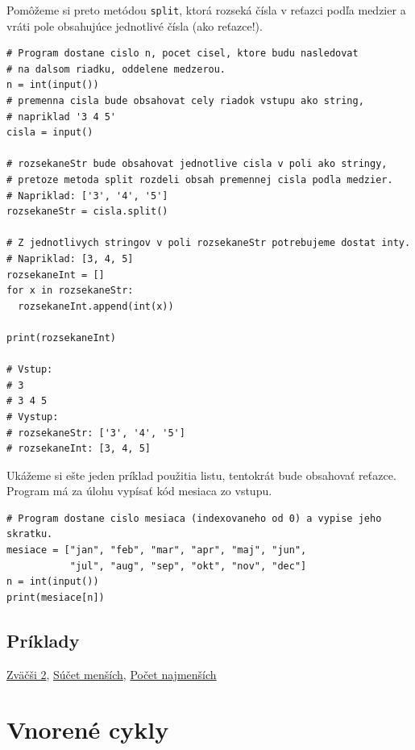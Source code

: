 \documentclass{article}
\begin{document}
Pomôžeme si preto metódou \texttt{split}, ktorá rozseká čísla v reťazci podľa medzier a vráti pole obsahujúce jednotlivé čísla (ako reťazce!).
\begin{lstlisting}
# Program dostane cislo n, pocet cisel, ktore budu nasledovat
# na dalsom riadku, oddelene medzerou.
n = int(input())
# premenna cisla bude obsahovat cely riadok vstupu ako string,
# napriklad '3 4 5'
cisla = input()

# rozsekaneStr bude obsahovat jednotlive cisla v poli ako stringy,
# pretoze metoda split rozdeli obsah premennej cisla podla medzier.
# Napriklad: ['3', '4', '5']
rozsekaneStr = cisla.split()

# Z jednotlivych stringov v poli rozsekaneStr potrebujeme dostat inty.
# Napriklad: [3, 4, 5]
rozsekaneInt = []
for x in rozsekaneStr:
  rozsekaneInt.append(int(x))

print(rozsekaneInt)

# Vstup:
# 3 
# 3 4 5
# Vystup:
# rozsekaneStr: ['3', '4', '5']
# rozsekaneInt: [3, 4, 5]
\end{lstlisting}

Ukážeme si ešte jeden príklad použitia listu, tentokrát bude obsahovať reťazce. Program má za úlohu vypísať kód mesiaca zo vstupu.
\begin{lstlisting}
# Program dostane cislo mesiaca (indexovaneho od 0) a vypise jeho skratku.
mesiace = ["jan", "feb", "mar", "apr", "maj", "jun",
           "jul", "aug", "sep", "okt", "nov", "dec"]
n = int(input())
print(mesiace[n])
\end{lstlisting}

\subsection{Príklady}
\href{https://testovac.ksp.sk/tasks/ls-uvod-zvacsi2/}{Zväčši 2},
\href{https://testovac.ksp.sk/tasks/ls-uvod-sucetmensich/}{Súčet menších},
\href{https://testovac.ksp.sk/tasks/ls-uvod-pocetnajmensich/}{Počet najmenších}

\section{Vnorené cykly}
\end{document}
